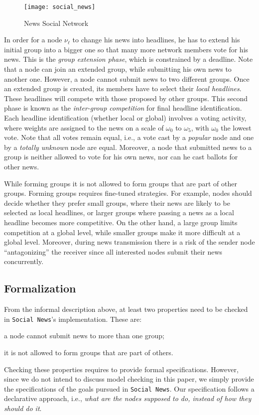 \begin{figure} 
	\centering 
	\texttt{[image: social\_news]} 
	\caption{News Social Network}
	\label{fig:sn-news-init} 
\end{figure}

In order for a node $\nu_\ell$ to change his news into headlines, he has to extend his initial group into a bigger one
so that many more network members vote for his news. This is the \emph{group extension phase}, which is constrained by
a deadline. Note that a node can join an extended group, while submitting his own news to another one. However, a node
cannot submit news to two different groups. Once an extended group is created, its members have to select their
\emph{local headlines}. These headlines will compete with those proposed by other groups. This second phase is known
as the \emph{inter-group competition} for final headline identification. Each headline identification (whether local or
global) involves a voting activity, where weights are assigned to the news on a scale of $\omega_0$ to $\omega_5$, with $\omega_0$
the lowest vote. Note that all votes remain equal, i.e., a vote cast by a \emph{popular} node and one by a \emph{totally
unknown} node are equal. Moreover, a node that submitted news to a group is neither allowed to vote for his own news, nor
can he cast ballots for other news.

While forming groups it is not allowed to form groups that are part of other groups. Forming groups requires
fine-tuned strategies. For example, nodes should decide whether they prefer small groups, where their news are likely
to be selected as local headlines, or larger groups where passing a news as a local headline becomes more competitive.
On the other hand, a large group limits competition at a global level, while smaller groups make it more difficult
at a global level. Moreover, during news transmission there is a risk of the sender node ``antagonizing'' the receiver
since all interested nodes submit their news concurrently.


\subsection{Formalization} %
\label{sub:formalization}

From the informal description above, at least two properties need to be checked in {\tt Social News}'s implementation.
These are: \begin{inparaenum} \item a node cannot submit news to more than one group; \item it is
not allowed to form groups that are part of others. \end{inparaenum} Checking these properties requires to provide formal
specifications. However, since we do not intend to discuss model checking in this paper, we simply provide the
specifications of the goals pursued in {\tt Social News}. Our specification follows a declarative approach, i.e.,
\emph{what are the nodes supposed to do, instead of how they should do it}.


